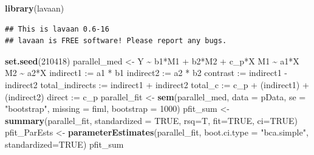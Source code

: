 \documentclass[
  11pt,
]{book}
\newenvironment{Shaded}{\begin{snugshade}}{\end{snugshade}}
\newcommand{\AttributeTok}[1]{\textcolor[rgb]{0.27,0.27,0.27}{#1}}
\newcommand{\ConstantTok}[1]{\textcolor[rgb]{0.37,0.37,0.37}{#1}}
\newcommand{\DecValTok}[1]{\textcolor[rgb]{0.06,0.06,0.06}{#1}}
\newcommand{\FunctionTok}[1]{\textcolor[rgb]{0.27,0.27,0.27}{\textbf{#1}}}
\newcommand{\NormalTok}[1]{#1}
\newcommand{\OtherTok}[1]{\textcolor[rgb]{0.37,0.37,0.37}{#1}}
\newcommand{\StringTok}[1]{\textcolor[rgb]{0.5,0.5,0.5}{#1}}
\begin{document}
\begin{Shaded}
\begin{Highlighting}[]
\FunctionTok{library}\NormalTok{(lavaan)}
\end{Highlighting}
\end{Shaded}

\begin{verbatim}
## This is lavaan 0.6-16
## lavaan is FREE software! Please report any bugs.
\end{verbatim}

\begin{Shaded}
\begin{Highlighting}[]
\FunctionTok{set.seed}\NormalTok{(}\DecValTok{210418}\NormalTok{)}
\NormalTok{parallel\_med }\OtherTok{\textless{}{-}} \StringTok{\textquotesingle{}}
\StringTok{    Y \textasciitilde{} b1*M1 + b2*M2 + c\_p*X}
\StringTok{    M1 \textasciitilde{} a1*X}
\StringTok{    M2 \textasciitilde{} a2*X}
\StringTok{    indirect1 := a1 * b1}
\StringTok{    indirect2 := a2 * b2}
\StringTok{    contrast := indirect1 {-} indirect2}
\StringTok{    total\_indirects := indirect1 + indirect2}
\StringTok{    total\_c    := c\_p + (indirect1) + (indirect2)}
\StringTok{    direct := c\_p}
\StringTok{ \textquotesingle{}}
\NormalTok{parallel\_fit }\OtherTok{\textless{}{-}} \FunctionTok{sem}\NormalTok{(parallel\_med, }\AttributeTok{data =}\NormalTok{ pData, }\AttributeTok{se =} \StringTok{"bootstrap"}\NormalTok{, }\AttributeTok{missing =} \StringTok{\textquotesingle{}fiml\textquotesingle{}}\NormalTok{, }\AttributeTok{bootstrap =} \DecValTok{1000}\NormalTok{)}
\NormalTok{pfit\_sum }\OtherTok{\textless{}{-}} \FunctionTok{summary}\NormalTok{(parallel\_fit, }\AttributeTok{standardized =} \ConstantTok{TRUE}\NormalTok{, }\AttributeTok{rsq=}\NormalTok{T, }\AttributeTok{fit=}\ConstantTok{TRUE}\NormalTok{, }\AttributeTok{ci=}\ConstantTok{TRUE}\NormalTok{)    }
\NormalTok{pfit\_ParEsts }\OtherTok{\textless{}{-}} \FunctionTok{parameterEstimates}\NormalTok{(parallel\_fit, }\AttributeTok{boot.ci.type =} \StringTok{"bca.simple"}\NormalTok{, }\AttributeTok{standardized=}\ConstantTok{TRUE}\NormalTok{)}
\NormalTok{pfit\_sum}
\end{Highlighting}
\end{Shaded}
\end{document}
